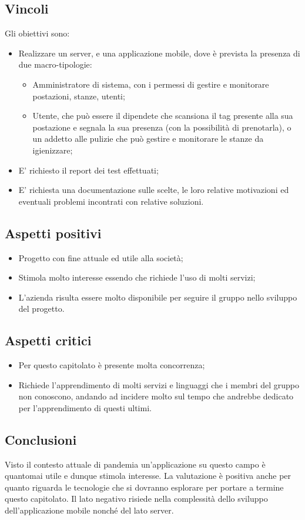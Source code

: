 \subsection{Vincoli}
Gli obiettivi sono:
\begin{itemize}
\item	Realizzare un server, e una applicazione mobile, dove è prevista la presenza di due macro-tipologie:
\begin{itemize}
\item	Amministratore di sistema, con i permessi di gestire e monitorare postazioni, stanze, utenti;
\item	Utente, che può essere il dipendete che scansiona il tag presente alla sua postazione e segnala la sua presenza (con la possibilità di prenotarla), o un addetto alle pulizie che può gestire e monitorare le stanze da igienizzare;
\end{itemize}
\item	E' richiesto il report dei test effettuati;
\item	E' richiesta una documentazione sulle scelte, le loro relative motivazioni ed eventuali problemi incontrati con relative soluzioni.
\end{itemize}

\subsection{Aspetti positivi}
\begin{itemize}
\item	Progetto con fine attuale ed utile alla società;
\item	Stimola molto interesse essendo che richiede l'uso di molti servizi;
\item	L'azienda risulta essere molto disponibile per seguire il gruppo nello sviluppo del progetto.
\end{itemize}
\subsection{Aspetti critici}
\begin{itemize}
\item	Per questo capitolato è presente molta concorrenza;
\item	Richiede l'apprendimento di molti servizi e linguaggi che i membri del gruppo non conoscono, andando ad incidere molto sul tempo che andrebbe dedicato per l'apprendimento di questi ultimi.
\end{itemize}

\subsection{Conclusioni}
Visto il contesto attuale di pandemia un'applicazione su questo campo è quantomai utile e dunque stimola interesse. La valutazione è positiva anche per quanto riguarda le tecnologie che si dovranno esplorare per portare a termine questo capitolato. Il lato negativo risiede nella complessità dello sviluppo dell'applicazione mobile nonché del lato server. 
